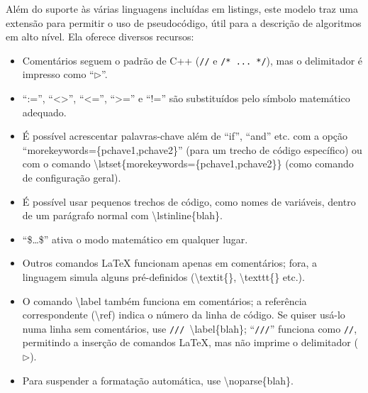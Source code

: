 Além do suporte às várias linguagens incluídas em \textsf{listings},
este modelo traz uma extensão para permitir o uso de pseudocódigo,
útil para a descrição de algoritmos em alto nível. Ela oferece
diversos recursos:

\begin{itemize}

    \item Comentários seguem o padrão de C++ (\lstinline{//} e
          \lstinline{/* ... */}), mas o delimitador é impresso
          como ``$\triangleright$''.

    \item ``:='', ``<>'', ``<='', ``>='' e ``!='' são substituídos
          pelo símbolo matemático adequado.

    \item É possível acrescentar palavras-chave além de ``if'', ``and''
          etc. com a opção ``\textsf{morekeywords=\{pchave1,\linebreak[0]{}pchave2\}}''
          (para um trecho de código específico) ou com o comando
          \textsf{\textbackslash{}lstset\{morekeywords=\linebreak[0]{}\{pchave1,pchave2\}\}}
          (como comando de configuração geral).

    \item É possível usar pequenos trechos de código, como nomes de variáveis,
          dentro de um parágrafo normal com \textsf{\textbackslash{}lstinline\{blah\}}.

    \item ``\$\dots\$'' ativa o modo matemático em qualquer lugar.

    \item Outros comandos \LaTeX{} funcionam apenas em comentários; fora, a
          linguagem simula alguns pré-definidos (\textsf{\textbackslash{}textit\{\}},
          \textsf{\textbackslash{}texttt\{\}} etc.).

    \item O comando \textsf{\textbackslash{}label} também funciona em
          comentários; a referência correspondente (\textsf{\textbackslash{}ref})
          indica o número da linha de código. Se quiser usá-lo numa linha sem
          comentários, use \lstinline{///}~\textsf{\textbackslash{}label\{blah\}};
          ``\lstinline{///}'' funciona como \lstinline{//}, permitindo
          a inserção de comandos \LaTeX{}, mas não imprime o delimitador
          (\ensuremath{\triangleright}).

    \item Para suspender a formatação automática, use \textsf{\textbackslash{}noparse\{blah\}}.


\end{itemize}
